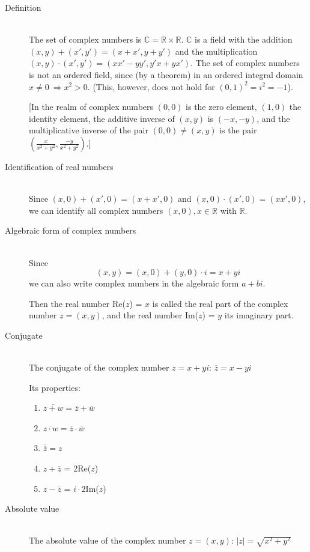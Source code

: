 \documentclass[margin=0px]{article}
\newcommand{\R}{\mathbb{R}}
\newcommand{\C}{\mathbb{C}}
\begin{document}
\begin{description}
    \item[Definition] \hfill \\
        The set of complex numbers is $\C = \R \times \R$. $\C$ is a field with the addition $(x,y)+(x',y') = (x+x', y+y')$ and the multiplication $(x,y)\cdot(x',y') = (xx'-yy', y'x+yx')$. The set of complex numbers is not an ordered field, since (by a theorem) in an ordered integral domain $ x \neq 0 \ \Rightarrow x^2 > 0$. (This, however, does not hold for $(0,1)^2=i^2 = -1$).

            [In the realm of complex numbers $(0,0)$ is the zero element, $(1,0)$ the identity element, the additive inverse of $(x,y)$ is $(-x,-y)$, and the multiplicative inverse of the pair $(0,0) \neq (x,y)$ is the pair $(\frac{x}{x^2+y^2}, \frac{-y}{x^2+y^2})$.]
    \item[Identification of real numbers] \hfill \\
        Since $(x,0)+(x',0) = (x+x',0)$ and $(x,0)\cdot(x',0) = (xx',0)$, we can identify all complex numbers $(x,0), x\in\R$ with $\R$.
    \item[Algebraic form of complex numbers] \hfill \\
        Since
        \[(x,y) = (x,0)+(y,0)\cdot i = x+yi\]
        we can also write complex numbers in the algebraic form $a+bi$.

        Then the real number Re($z$) = $x$ is called the real part of the complex number $z = (x,y)$, and the real number Im($z$) = $y$ its imaginary part.
    \item[Conjugate] \hfill \\
        The conjugate of the complex number $ z = x+yi$: $\overline{z} = x-yi$

        Its properties:
        \begin{enumerate}
            \item $\overline{z+w} = \overline{z}+\overline{w}$
            \item $\overline{z\cdot w} = \overline{z}\cdot\overline{w}$
            \item $\overline{\overline{z}} = z$
            \item $z + \overline{z}$ = 2Re($z$)
            \item $z - \overline{z}$ = $i\cdot2$Im($z$)
        \end{enumerate}
    \item[Absolute value] \hfill \\
        The absolute value of the complex number $z=(x,y)$: $|z| = \sqrt{x^2+y^2}$


\end{description}
\end{document}
